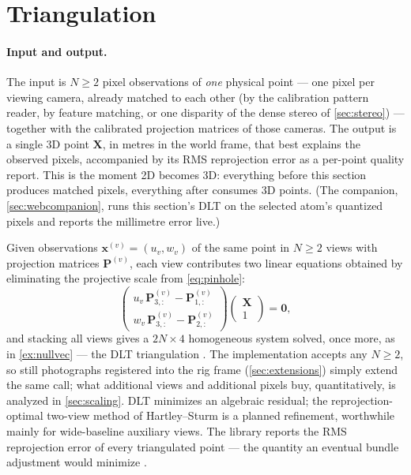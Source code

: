 \documentclass[11pt]{article}
\theoremstyle{definition}
\newcommand{\mat}[1]{\mathbf{#1}}
\newcommand{\vect}[1]{\mathbf{#1}}
\newcommand{\PP}{\mat{P}}
\newcommand{\X}{\vect{X}}
\newcommand{\x}{\vect{x}}
\begin{document}
\section{Triangulation}
\label{sec:triangulation}

\paragraph{Input and output.} The input is $N\ge2$ pixel observations of
\emph{one} physical point --- one pixel per viewing camera, already
matched to each other (by the calibration pattern reader, by feature
matching, or one disparity of the dense stereo of \autoref{sec:stereo})
--- together with the calibrated projection matrices of those cameras.
The output is a single 3D point $\X$, in metres in the world frame,
that best explains the observed pixels, accompanied by its RMS
reprojection error as a per-point quality report. This is the moment 2D
becomes 3D: everything before this section produces matched pixels,
everything after consumes 3D points. (The companion,
\autoref{sec:webcompanion}, runs this section's DLT on the selected
atom's quantized pixels and reports the millimetre error live.)

Given observations $\x^{(v)} = (u_v, w_v)$ of the same point in $N\ge2$ views
with projection matrices $\PP^{(v)}$, each view contributes two linear
equations obtained by eliminating the projective scale from
\eqref{eq:pinhole}:
\begin{equation}
\begin{pmatrix}
u_v\,\PP^{(v)}_{3,:} - \PP^{(v)}_{1,:}\\[2pt]
w_v\,\PP^{(v)}_{3,:} - \PP^{(v)}_{2,:}
\end{pmatrix}
\begin{pmatrix}\X\\1\end{pmatrix} = \vect{0},
\label{eq:dlt}
\end{equation}
and stacking all views gives a $2N\times4$ homogeneous system solved, once
more, as in \autoref{ex:nullvec} --- the DLT triangulation
\cite{HartleyZisserman2004}. The implementation accepts any $N\ge2$, so
still photographs registered into the rig frame (\autoref{sec:extensions})
simply extend the same call; what additional views and additional pixels
buy, quantitatively, is analyzed in \autoref{sec:scaling}. DLT minimizes an algebraic residual; the
reprojection-optimal two-view method of Hartley--Sturm
\cite{HartleySturm1997} is a planned refinement, worthwhile mainly for
wide-baseline auxiliary views. The library reports the RMS reprojection
error of every triangulated point --- the quantity an eventual bundle
adjustment would minimize \cite{Triggs2000}.
\end{document}
